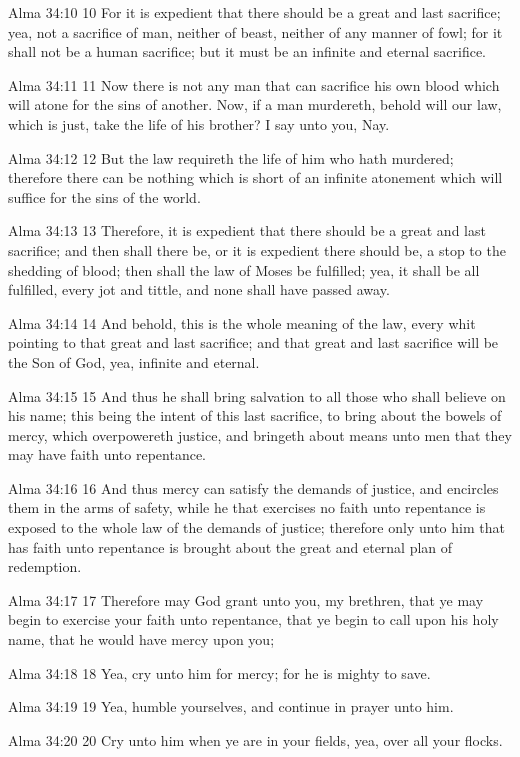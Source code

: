 Alma 34:10
 10 For it is expedient that there should be a great and last
sacrifice; yea, not a sacrifice of man, neither of beast, neither
of any manner of fowl; for it shall not be a human sacrifice; but
it must be an infinite and eternal sacrifice.

Alma 34:11
 11 Now there is not any man that can sacrifice his own blood
which will atone for the sins of another. Now, if a man
murdereth, behold will our law, which is just, take the life of
his brother? I say unto you, Nay.

Alma 34:12
 12 But the law requireth the life of him who hath murdered;
therefore there can be nothing which is short of an infinite
atonement which will suffice for the sins of the world.

Alma 34:13
 13 Therefore, it is expedient that there should be a great and
last sacrifice; and then shall there be, or it is expedient there
should be, a stop to the shedding of blood; then shall the law of
Moses be fulfilled; yea, it shall be all fulfilled, every jot and
tittle, and none shall have passed away.

Alma 34:14
 14 And behold, this is the whole meaning of the law, every whit
pointing to that great and last sacrifice; and that great and
last sacrifice will be the Son of God, yea, infinite and eternal.

Alma 34:15
 15 And thus he shall bring salvation to all those who shall
believe on his name; this being the intent of this last
sacrifice, to bring about the bowels of mercy, which overpowereth
justice, and bringeth about means unto men that they may have
faith unto repentance.

Alma 34:16
 16 And thus mercy can satisfy the demands of justice, and
encircles them in the arms of safety, while he that exercises no
faith unto repentance is exposed to the whole law of the demands
of justice; therefore only unto him that has faith unto
repentance is brought about the great and eternal plan of
redemption.

Alma 34:17
 17 Therefore may God grant unto you, my brethren, that ye may
begin to exercise your faith unto repentance, that ye begin to
call upon his holy name, that he would have mercy upon you;

Alma 34:18
 18 Yea, cry unto him for mercy; for he is mighty to save.

Alma 34:19
 19 Yea, humble yourselves, and continue in prayer unto him.

Alma 34:20
 20 Cry unto him when ye are in your fields, yea, over all your
flocks.

